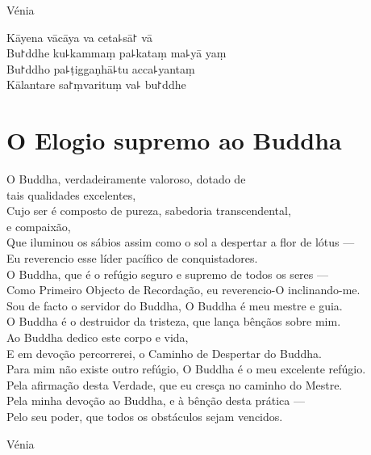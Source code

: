 \begin{instruction}
  Vénia
\end{instruction}

Kāyena vācāya va ceta꜕sā꜓ vā\\
Bu꜓ddhe ku꜕kammaṃ pa꜕kataṃ ma꜕yā yaṃ\\
Bu꜓ddho pa꜕ṭiggaṇhā꜕tu acca꜕yantaṃ\\
Kālantare sa꜓ṃvarituṃ va꜕ bu꜓ddhe

\clearpage

\chapter{O Elogio supremo ao Buddha}

\begin{leader}
\end{leader}

O Buddha, verdadeiramente valoroso, dotado de\\
\vin tais qualidades  excelentes,\\
Cujo ser é composto de pureza, sabedoria transcendental,\\
\vin e compaixão,\\
Que iluminou os sábios assim como o sol a despertar a flor de lótus ---\\
Eu reverencio esse líder pacífico de conquistadores.\\
O Buddha, que é o refúgio seguro e supremo de todos os seres ---\\
Como Primeiro Objecto de Recordação, eu reverencio-O inclinando-me.\\
Sou de facto o servidor do Buddha, O Buddha é meu mestre e guia.\\
O Buddha é o destruidor da tristeza, que lança bênçãos sobre mim.\\
Ao Buddha dedico este corpo e vida,\\
E em devoção percorrerei, o Caminho de Despertar do Buddha.\\
Para mim não existe outro refúgio, O Buddha é o meu excelente refúgio.\\
Pela afirmação desta Verdade, que eu cresça no caminho do Mestre.\\
Pela minha devoção ao Buddha, e à bênção desta prática ---\\
Pelo seu poder, que todos os obstáculos sejam vencidos.

\begin{instruction}
  Vénia
\end{instruction}

